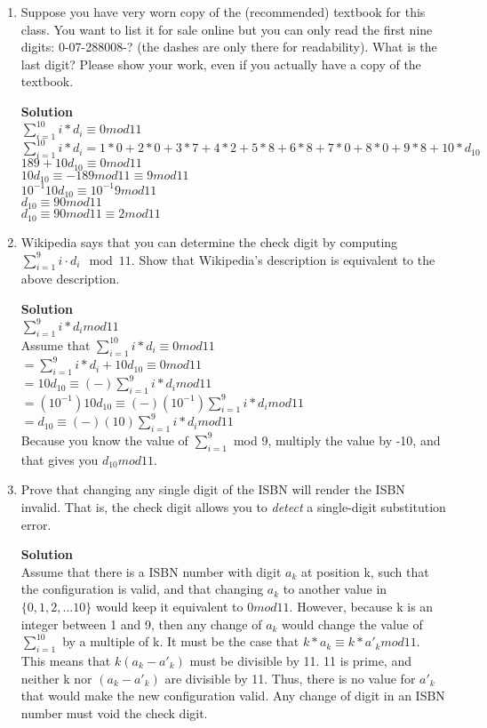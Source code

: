 \documentclass[11pt]{article}
\newenvironment{Parts}{\begin{enumerate}[label=(\alph*)]}{\end{enumerate}}
\newcommand*{\Part}{\item}
\begin{document}
\begin{Parts}
  \Part Suppose you have very worn copy of the (recommended) textbook for this class. You want to list it for sale online but you can only read the first nine digits: 0-07-288008-? (the dashes are only there for readability). What is the last digit? Please show your work, even if you actually have a copy of the textbook.
   \begin{mdframed} \textbf{Solution} \\
\textbf{$\sum_{i=1}^10 i*d_i \equiv 0mod11$} \\
$\sum_{i=1}^10 i*d_i=1*0+2*0+3*7+4*2+5*8+6*8+7*0+8*0+9*8+10*d_10$ \\
$189+10d_10 \equiv 0mod11$ \\
$10d_10 \equiv -189mod11 \equiv 9mod11$ \\
$10^{-1}10d_10 \equiv 10^{-1}9mod11$ \\
$d_10 \equiv 90mod11$ \\
$d_10 \equiv 90mod11 \equiv 2mod11$ \\
\end{mdframed}
  
  \Part Wikipedia says that you can determine the check digit by computing $\sum_{i=1}^9 i\cdot d_i \mod 11$. Show that Wikipedia's description is equivalent to the above description.
  \begin{mdframed} \textbf{Solution} \\
\textbf{$\sum_{i=1}^9 i*d_i mod11$} \\
Assume that $\sum_{i=1}^10 i*d_i \equiv 0mod11$ \\
$=\sum_{i=1}^9 i*d_i+10d_10 \equiv 0mod11$ \\
$=10d_10 \equiv (-)\sum_{i=1}^9 i*d_imod11$ \\
$=(10^{-1})10d_10 \equiv (-)(10^{-1})\sum_{i=1}^9 i*d_imod11$ \\
$=d_10 \equiv (-)(10)\sum_{i=1}^9 i*d_imod11$ \\
Because you know the value of $\sum_{i=1}^9$ mod 9, multiply the value by -10, and that gives you $d_10mod11$.
\end{mdframed}
    
  \Part Prove that changing any single digit of the ISBN will render the ISBN invalid. That is, the check digit allows you to \textit{detect} a single-digit substitution error.
  \begin{mdframed} \textbf{Solution} \\
Assume that there is a ISBN number with digit $a_k$ at position k, such that the configuration is valid, and that changing $a_k$ to another value in $\{0,1,2,...10\}$ would keep it equivalent to $0mod11$. However, because k is an integer between 1 and 9, then any change of $a_k$ would change the value of $\sum_{i=1}^10$ by a multiple of k. It must be the case that $k*a_k \equiv k*a'_kmod11$. This means that $k(a_k-a'_k)$ must be divisible by 11. 11 is prime, and neither k nor $(a_k-a'_k)$ are divisible by 11. Thus, there is no value for $a'_k$ that would make the new configuration valid. Any change of digit in an ISBN number must void the check digit. \end{mdframed}


\end{Parts}
\end{document}

